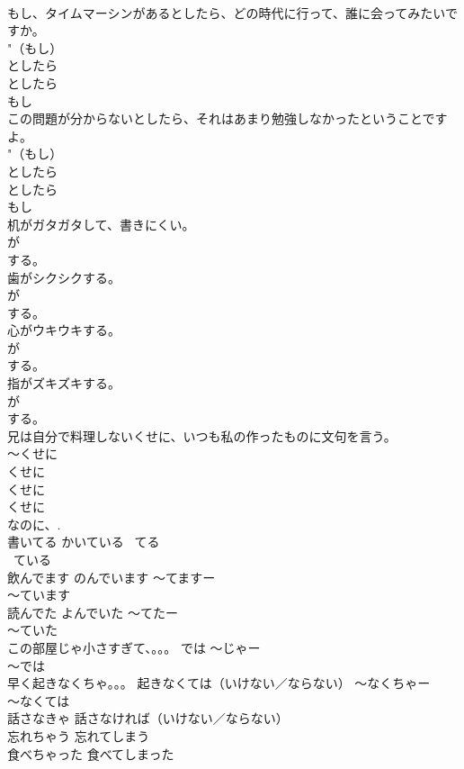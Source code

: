 \documentclass[8pt]{extreport}
\begin{document}
\begin{CJK}{UTF8}{min}
{\\	もし、タイムマーシンがあるとしたら、どの時代に行って、誰に会ってみたいですか。	
\\	"（もし）
\\	としたら 
\\	としたら 
\\	もし 
\\	この問題が分からないとしたら、それはあまり勉強しなかったということですよ。	
\\	"（もし）
\\	としたら 
\\	としたら 
\\	もし 
\\	机がガタガタして、書きにくい。	
\\	が　
\\	する。 
\\	歯がシクシクする。	
\\	が　
\\	する。 
\\	心がウキウキする。	
\\	が　
\\	する。 
\\	指がズキズキする。	
\\	が　
\\	する。 
\\	兄は自分で料理しないくせに、いつも私の作ったものに文句を言う。	
\\	〜くせに 
\\	くせに 
\\	くせに 
\\	くせに 
\\	なのに、.
\\	書いてる	かいている ~てる 
\\	~ている	
\\	飲んでます	のんでいます 〜てますー
\\	〜ています	
\\	読んでた	よんでいた 〜てたー
\\	〜ていた	
\\	この部屋じゃ小さすぎて、。。。	では 〜じゃー
\\	〜では	
\\	早く起きなくちゃ。。。	起きなくては（いけない／ならない） 〜なくちゃー
\\	〜なくては
\\	話さなきゃ	話さなければ（いけない／ならない）	
\\	忘れちゃう	忘れてしまう	
\\	食べちゃった	食べてしまった	
}
\end{CJK}
\end{document}
